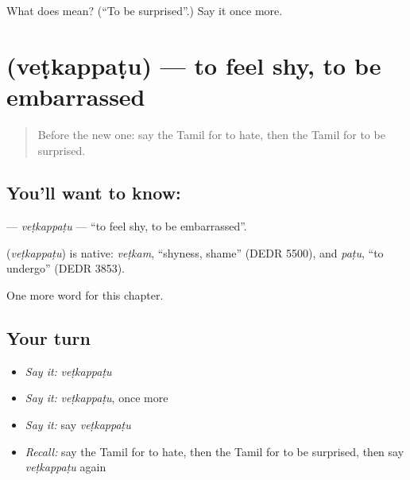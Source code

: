 \begin{tcolorbox}[breakable,colback=teal!4,colframe=teal!35!black,title={Before you move on}]
What does  mean? (\textquotedblleft{}To be surprised\textquotedblright{}.) Say it once more.
\end{tcolorbox}
\section[\texorpdfstring{\ta{வெட்கப்படு} (veṭkappaṭu)}{வெட்கப்படு (veṭkappaṭu)}]{ (veṭkappaṭu) — to feel shy, to be embarrassed}

\label{lesson:TA-C257-vetkappatu}



\begin{quote}
Before the new one: say the Tamil for to hate, then the Tamil for to be surprised.
\end{quote}

\subsection*{You'll want to know: }
\textbf{} — \emph{veṭkappaṭu} — \textquotedblleft{}to feel shy, to be embarrassed\textquotedblright{}.

\begin{cousinweb}
\textbf{} (\emph{veṭkappaṭu}) is native: \emph{veṭkam}, \textquotedblleft{}shyness, shame\textquotedblright{} (DEDR 5500), and \emph{paṭu}, \textquotedblleft{}to undergo\textquotedblright{} (DEDR 3853).
\end{cousinweb}

\begin{grammarlens}[title={What you've built}]
One more word for this chapter.
\end{grammarlens}

\subsection*{Your turn}
\begin{itemize}
\raggedright
  \item \emph{Say it:} \emph{veṭkappaṭu}
  \item \emph{Say it:} \emph{veṭkappaṭu}, once more
  \item \emph{Say it:} say \emph{veṭkappaṭu}
  \item \emph{Recall:} say the Tamil for to hate, then the Tamil for to be surprised, then say \emph{veṭkappaṭu} again
\end{itemize}

